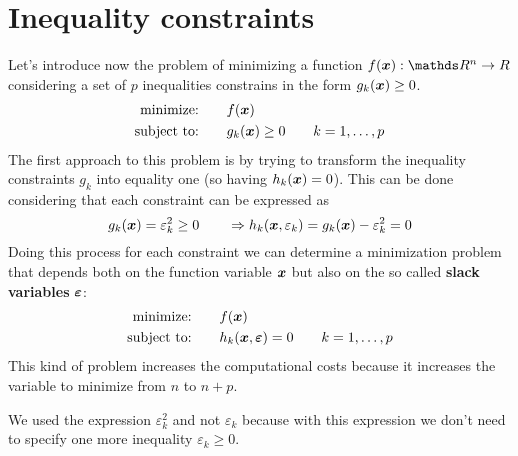 \section{Inequality constraints}
	Let's introduce now the problem of minimizing a function $f(\vett x):\R^n\rightarrow R$ considering a set of $p$ inequalities constrains in the form $g_k(\boldsymbol{x}) \geq 0$.
	\begin{align*}
		\textrm{minimize:} \qquad & f(\boldsymbol{x}) \\
		\textrm{subject to:}\qquad & g_k(\boldsymbol{x}) \geq 0 \qquad k = 1,\dots,p
	\end{align*}
	The first approach to this problem is by trying to transform the inequality constraints $g_k$ into equality one (so having $h_k(\boldsymbol{x}) = 0$). This can be done considering that each constraint can be expressed as
	\[ g_k(\boldsymbol{x}) = \varepsilon_k^2 \geq 0 \qquad \Rightarrow h_k(\boldsymbol{x},\varepsilon_k) = g_k(\boldsymbol{x}) - \varepsilon_k^2 = 0  \]
	Doing this process for each constraint we can determine a minimization problem that depends both on the function variable $\boldsymbol{x}$ but also on the so called \textbf{slack variables} $\boldsymbol{\varepsilon}$:
	\begin{align*}
		\textrm{minimize:} \qquad & f(\boldsymbol{x}) \\
		\textrm{subject to:}\qquad & h_k(\boldsymbol{x}, \boldsymbol{\varepsilon}) = 0 \qquad k = 1,\dots,p
	\end{align*}
	This kind of problem increases the computational costs because it increases the variable to minimize from $n$ to $n+p$.
	\begin{note}
		We used the expression $\varepsilon_k^2$ and not $\varepsilon_k$ because with this expression we don't need to specify one more inequality $\varepsilon_k \geq 0$.
	\end{note}
